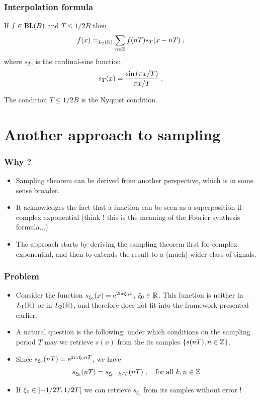\begin{frame}
\frametitle{Interpolation formula}
\begin{theorem}
If $f \in \mathrm{BL}(B)$ and $T \leq 1/2B$ then
\alert{
\begin{equation*}
f(x) =_{L_2(\mathbb{R})} \sum_{n \in \mathbb{Z}} f(nT) s_T(x-nT)  \;,
\end{equation*}
}
where $s_T$, is the cardinal-sine function
\alert{
$$
s_T(x) = \frac{\sin \left( \pi x/T\right) }{ \pi x/T}\;.
$$
}
\end{theorem}
The condition  \alert{$T \leq 1/2B$} is the \alert{Nyquist condition}.
\end{frame}

\section{Another approach to sampling}
\begin{frame}
\frametitle{Why ?}
\begin{itemize}
\item Sampling theorem can be derived from another perspective, which is in some sense broader.
\item It acknowledges the fact that a function can be seen as a superposition if complex exponential (\alert{think !} this is the meaning of the Fourier synthesis formula...)
\item The approach starts by deriving the sampling theorem first for complex exponential, and then to extends the result to a (much) wider class of signals.
\end{itemize}
\end{frame}

\begin{frame}
\frametitle{Problem}
\begin{itemize}
\item Consider the function $s_{\xi_0}(x)= \mathrm{e}^{2 \mathrm{i} \pi \xi_0 x}$, $\xi_0 \in \mathbb{R}$. This function is neither in $L_1(\mathbb{R})$ or in $L_2(\mathbb{R})$, and therefore does not fit into the framework presented earlier.
\item A natural question is the following: under which conditions on the sampling period $T$ may we retrieve $s(x)$ from the its samples $\{s(nT), n \in \mathbb{Z}\}$.
\item Since $s_{\xi_0}(nT)= \mathrm{e}^{2 \mathrm{i} \pi \xi_0 n T}$, we have
$$
s_{\xi_0}(nT)= s_{\xi_0 + k/T}(nT) \;, \quad \text{for all $k,n \in \mathbb{Z}$}
$$
\item If $\xi_0 \in \left]-1/2T,1/2T\right[$ we can retrieve $s_{\xi_0}$ from its samples without error !
\end{itemize}
\end{frame}


